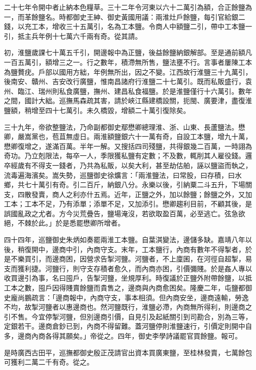 二十七年令開中者止納本色糧草。三十二年令河東以六十二萬引為額，合正餘鹽為一，而革餘鹽名。時都御史王紳、御史黃國用議：兩淮灶戶餘鹽，每引官給銀二錢，以充工本，增收三十五萬引，名為工本鹽。令商人中額鹽二引，帶中工本鹽一引，抵主兵年例十七萬六千兩有奇。從其請。

初，淮鹽歲課七十萬五千引，開邊報中為正鹽，後益餘鹽納銀解部。至是通前額凡一百五萬引，額增三之一。行之數年，積滯無所售，鹽法壅不行。言事者屢陳工本為鹽贅疣。戶部以國用方絀，年例無所出，因之不變。江西故行淮鹽三十九萬引，後南安、贛州、吉安改行廣鹽，惟南昌諸府行淮鹽二十七萬引。既而私販盛行，袁州、臨江、瑞州則私食廣鹽，撫州、建昌私食福鹽。於是淮鹽僅行十六萬引。數年之間，國計大絀。巡撫馬森疏其害，請於峽江縣建橋設關，扼閩、廣要津，盡復淮鹽額，稍增至四十七萬引。未久橋毀，增額二十萬引復除矣。

三十九年，帝欲整鹽法，乃命副都御史鄢懋卿總理淮、浙、山東、長蘆鹽法。懋卿，嚴嵩黨也，苞苴無虛日。兩淮額鹽銀六十一萬有奇，自設工本鹽，增九十萬，懋卿復增之，遂滿百萬。半年一解。又搜括四司殘鹽，共得銀幾二百萬，一時詡為奇功。乃立剋限法，每卒一人，季限獲私鹽有定數；不及數，輒削其人雇役錢。邏卒經歲有不得支一錢者，乃共為私販，以矣大利，甚至劫估舶，誣以鹽盜而執之，流毒遍海濱矣。嵩失勢，巡鹽御史徐爌言：「兩淮鹽法，曰常股，曰存積，曰水鄉，共七十萬引有奇。引二百斤，納銀八分。永樂以後，引納粟二斗五升，下場關支，四散發賣，商人之利亦什五焉。近年，正鹽之外，加以餘鹽；餘鹽之外，又加工本；工本不足，乃有添單；添單不足，又加添引。懋卿趨利目前，不顧其後，是誤國亂政之尤者。方今災荒疊告，鹽場淹沒，若欲取盈百萬，必至逃亡。弦急欲絕，不棘於此。」於是悉罷懋卿所增者。

四十四年，巡鹽御史朱炳如奏罷兩淮工本鹽。自葉淇變法，邊儲多缺。嘉靖八年以後，稍復開中，邊商中引，內商守支。末年，工本鹽行，內商有數年不得掣者，於是不樂買引，而邊商困，因營求告掣河鹽。河鹽者，不上廩囷，在河徑自超掣，易支而獲利捷。河鹽行，則守支存積者愈久，而內商亦困，引價彌賤。於是姦人專以收買邊引為事，名曰囤戶，告掣河鹽，坐規厚利。時復議於正鹽外附帶餘鹽，以抵工本之數，囤戶因得賤賣餘鹽而貴售之，邊商與內商愈困矣。隆慶二年，屯鹽都御史龐尚鵬疏言：「邊商報中，內商守支，事本相須。但內商安坐，邊商遠輸，勞逸不均，故掣河鹽者以惠邊商也。然河鹽既行，淮鹽必滯，內商無所得利，則邊商之引不售。今宜停掣河鹽，但別邊商引價，自見引及起紙關引到司勘合，別為三等，定銀若干。邊商倉鈔已到，內商不得留難。蓋河鹽停則淮鹽速行，引價定則開中自多，邊商內商各得其願矣。」帝從之。四年，御史李學詩議罷官買餘鹽。報可。

是時廣西古田平，巡撫都御史殷正茂請官出資本買廣東鹽，至桂林發賣，七萬餘包可獲利二萬二千有奇。從之。

